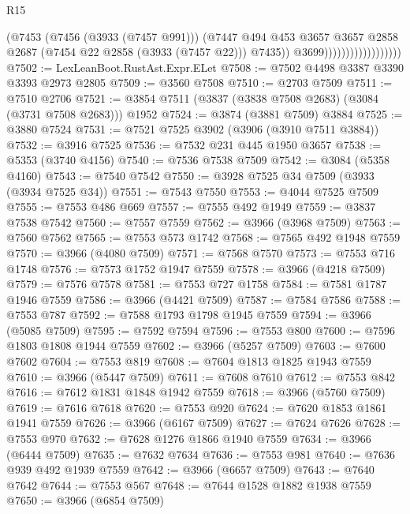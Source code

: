 \begin{lexlean}{R15}
\begin{coremodule}
                                        (@7453
                                          (@7456 (@3933 (@7457 @991)))
                                          (@7447
                                            @494
                                            @453
                                            @3657
                                            @3657
                                            @2858
                                            @2687
                                            (@7454 @22 @2858 (@3933 (@7457 @22)))
                                            @7435))
                                        @3699))))))))))))))))))
@7502 := LexLeanBoot.RustAst.Expr.ELet
@7508 := @7502 @4498 @3387 @3390 @3393 @2973 @2805
@7509 := @3560 @7508
@7510 := @2703 @7509
@7511 := @7510 @2706
@7521 := @3854 @7511 (@3837 (@3838 @7508 @2683) (@3084 (@3731 @7508 @2683))) @1952
@7524 := @3874 (@3881 @7509) @3884
@7525 := @3880 @7524
@7531 := @7521 @7525 @3902 (@3906 (@3910 @7511 @3884))
@7532 := @3916 @7525
@7536 := @7532 @231 @445 @1950 @3657
@7538 := @5353 (@3740 @4156)
@7540 := @7536 @7538 @7509
@7542 := @3084 (@5358 @4160)
@7543 := @7540 @7542
@7550 := @3928 @7525 @34 @7509 (@3933 (@3934 @7525 @34))
@7551 := @7543 @7550
@7553 := @4044 @7525 @7509
@7555 := @7553 @486 @669
@7557 := @7555 @492 @1949
@7559 := @3837 @7538 @7542
@7560 := @7557 @7559
@7562 := @3966 (@3968 @7509)
@7563 := @7560 @7562
@7565 := @7553 @573 @1742
@7568 := @7565 @492 @1948 @7559
@7570 := @3966 (@4080 @7509)
@7571 := @7568 @7570
@7573 := @7553 @716 @1748
@7576 := @7573 @1752 @1947 @7559
@7578 := @3966 (@4218 @7509)
@7579 := @7576 @7578
@7581 := @7553 @727 @1758
@7584 := @7581 @1787 @1946 @7559
@7586 := @3966 (@4421 @7509)
@7587 := @7584 @7586
@7588 := @7553 @787
@7592 := @7588 @1793 @1798 @1945 @7559
@7594 := @3966 (@5085 @7509)
@7595 := @7592 @7594
@7596 := @7553 @800
@7600 := @7596 @1803 @1808 @1944 @7559
@7602 := @3966 (@5257 @7509)
@7603 := @7600 @7602
@7604 := @7553 @819
@7608 := @7604 @1813 @1825 @1943 @7559
@7610 := @3966 (@5447 @7509)
@7611 := @7608 @7610
@7612 := @7553 @842
@7616 := @7612 @1831 @1848 @1942 @7559
@7618 := @3966 (@5760 @7509)
@7619 := @7616 @7618
@7620 := @7553 @920
@7624 := @7620 @1853 @1861 @1941 @7559
@7626 := @3966 (@6167 @7509)
@7627 := @7624 @7626
@7628 := @7553 @970
@7632 := @7628 @1276 @1866 @1940 @7559
@7634 := @3966 (@6444 @7509)
@7635 := @7632 @7634
@7636 := @7553 @981
@7640 := @7636 @939 @492 @1939 @7559
@7642 := @3966 (@6657 @7509)
@7643 := @7640 @7642
@7644 := @7553 @567
@7648 := @7644 @1528 @1882 @1938 @7559
@7650 := @3966 (@6854 @7509)

\end{coremodule}
\end{lexlean}
